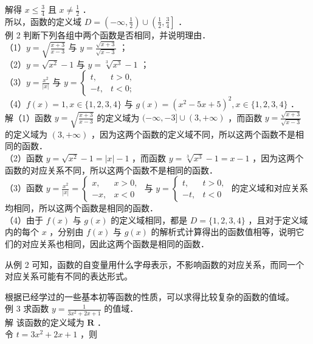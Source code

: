 \documentclass[10pt]{article}
\begin{document}
解得 \(x \leqslant \frac{3}{4}\) 且 \(x \neq \frac{1}{2}\) ．\\
所以，函数的定义域 \(D=\left(-\infty, \frac{1}{2}\right) \cup\left(\frac{1}{2}, \frac{3}{4}\right]\) ．\\
例 2 判断下列各组中两个函数是否相同，并说明理由．\\
（1）\(y=\sqrt{\frac{x+3}{x-3}}\) 与 \(y=\frac{\sqrt{x+3}}{\sqrt{x-3}}\) ；\\
（2）\(y=\sqrt{x^{2}}-1\) 与 \(y=\sqrt[3]{x^{3}}-1\) ；\\
（3）\(y=\frac{x^{2}}{|x|}\) 与 \(y= \begin{cases}t, & t>0, \\ -t, & t<0 ;\end{cases}\)\\
（4）\(f(x)=1, x \in\{1,2,3,4\}\) 与 \(g(x)=\left(x^{2}-5 x+5\right)^{2}, x \in\{1,2,3,4\}\) ．\\
解（1）函数 \(y=\sqrt{\frac{x+3}{x-3}}\) 的定义域为 \((-\infty,-3] \cup(3,+\infty)\) ，而函数 \(y=\frac{\sqrt{x+3}}{\sqrt{x-3}}\) 的定义域为 \((3,+\infty)\) ，因为这两个函数的定义域不同，所以这两个函数不是相同的函数．\\
（2）函数 \(y=\sqrt{x^{2}}-1=|x|-1\) ，而函数 \(y=\sqrt[3]{x^{3}}-1=x-1\) ，因为这两个函数的对应关系不同，所以这两个函数不是相同的函数．\\
（3）函数 \(y=\frac{x^{2}}{|x|}=\left\{\begin{array}{ll}x, & x>0, \\ -x, & x<0\end{array}\right.\) 与 \(y=\left\{\begin{array}{ll}t, & t>0, \\ -t, & t<0\end{array}\right.\) 的定义域和对应关系均相同，所以这两个函数是相同的函数．\\
（4）由于 \(f(x)\) 与 \(g(x)\) 的定义域相同，都是 \(D=\{1,2,3,4\}\) ，且对于定义域内的每个 \(x\) ，分别由 \(f(x)\) 与 \(g(x)\) 的解析式计算得出的函数值相等，说明它们的对应关系也相同，因此这两个函数是相同的函数．

从例 2 可知，函数的自变量用什么字母表示，不影响函数的对应关系，而同一个对应关系可能有不同的表达形式。

根据已经学过的一些基本初等函数的性质，可以求得比较复杂的函数的值域。\\
例 3 求函数 \(y=\frac{1}{3 x^{2}+2 x+1}\) 的值域．\\
解 该函数的定义域为 \(\mathbf{R}\) ．\\
令 \(t=3 x^{2}+2 x+1\) ，则
\end{document}
